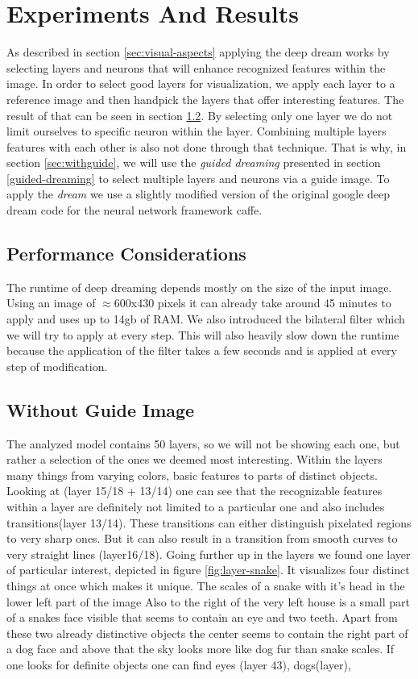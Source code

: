 \section{Experiments And Results}
\label{sec:evaluation}
As described in section \ref{sec:visual-aspects} applying the deep dream works by selecting layers and neurons that will enhance recognized features within the image.
In order to select good layers for visualization, we apply each layer to a reference image and then handpick the layers that offer interesting features. The result of that can be seen in section \ref{sec:withoutguide}.
By selecting only one layer we do not limit ourselves to specific neuron within the layer. Combining multiple layers features with each other is also not done through that technique. That is why, in section \ref{sec:withguide}, we will use the \emph{guided dreaming} presented in section \ref{guided-dreaming} to select multiple layers and neurons via a guide image.
To apply the \emph{dream} we use a slightly modified version of the original google deep dream code for the neural network framework caffe\cite{googledeepdream}.

\subsection{Performance Considerations}
The runtime of deep dreaming depends mostly on the size of the input image.
Using an image of $\approx$600x430 pixels it can already take around 45 minutes to apply and uses up to 14gb of RAM.
We also introduced the bilateral filter which we will try to apply at every step. This will also heavily slow down the runtime because the application of the filter takes a few seconds and is applied at every step of modification.
\subsection{Without Guide Image}
\label{sec:withoutguide}
The analyzed model contains 50 layers, so we will not be showing each one, but rather a selection of the ones we deemed most interesting.
Within the layers many things from varying colors, basic features to parts of distinct objects.
Looking at (layer 15/18 + 13/14) one can see that the recognizable features within a layer are definitely not limited to a particular one and also includes transitions(layer 13/14). These transitions can either distinguish pixelated regions to very sharp ones. But it can also result in a transition from smooth curves to very straight lines (layer16/18).
Going further up in the layers we found one layer of particular interest, depicted in figure \ref{fig:layer-snake}. It visualizes four distinct things at once which makes it unique. The scales of a snake with it's head in the lower left part of the image Also to the right of the very left house is a small part of a snakes face visible that seems to contain an eye and two teeth. Apart from these two already distinctive objects the center seems to contain the right part of a dog face and above that the sky looks more like dog fur than snake scales.  
If one looks for definite objects one can find eyes (layer 43), dogs(layer), 

